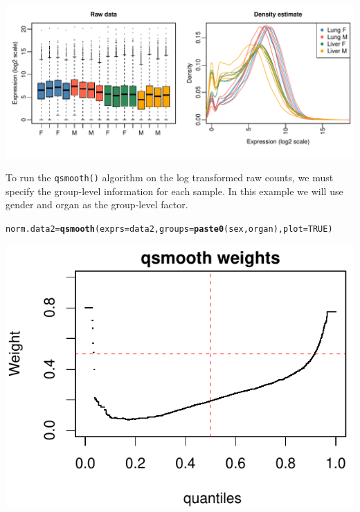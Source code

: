 \documentclass{article}\usepackage[]{graphicx}\usepackage[usenames,dvipsnames]{color}
\makeatletter
\def\maxwidth{ %
  \ifdim\Gin@nat@width>\linewidth
    \linewidth
  \else
    \Gin@nat@width
  \fi
}
\newcommand{\hlnum}[1]{\textcolor[rgb]{0.686,0.059,0.569}{#1}}%
\newcommand{\hlstd}[1]{\textcolor[rgb]{0.345,0.345,0.345}{#1}}%
\newcommand{\hlkwb}[1]{\textcolor[rgb]{0.69,0.353,0.396}{#1}}%
\newcommand{\hlkwc}[1]{\textcolor[rgb]{0.333,0.667,0.333}{#1}}%
\newcommand{\hlkwd}[1]{\textcolor[rgb]{0.737,0.353,0.396}{\textbf{#1}}}%
\newenvironment{kframe}{%
 \def\at@end@of@kframe{}%
 \ifinner\ifhmode%
  \def\at@end@of@kframe{\end{minipage}}%
  \begin{minipage}{\columnwidth}%
 \fi\fi%
 \def\FrameCommand##1{\hskip\@totalleftmargin \hskip-\fboxsep
 \colorbox{shadecolor}{##1}\hskip-\fboxsep
     \hskip-\linewidth \hskip-\@totalleftmargin \hskip\columnwidth}%
 \MakeFramed {\advance\hsize-\width
   \@totalleftmargin\z@ \linewidth\hsize
   \@setminipage}}%
 {\par\unskip\endMakeFramed%
 \at@end@of@kframe}
\newenvironment{knitrout}{}{} %
\makeatother
\begin{document}
\begin{knitrout}
\color{fgcolor}

{\centering \includegraphics[width=\maxwidth]{figure/norm_data2-1} 

}



\end{knitrout}

To run the \texttt{qsmooth()} algorithm on the log transformed raw counts, 
we must specify the group-level information for each sample. In this example 
we will use gender and organ as the group-level factor. 

\begin{knitrout}
\color{fgcolor}\begin{kframe}
\begin{alltt}
\hlstd{norm.data2} \hlkwb{=} \hlkwd{qsmooth}\hlstd{(}\hlkwc{exprs}\hlstd{=data2,} \hlkwc{groups}\hlstd{=}\hlkwd{paste0}\hlstd{(sex, organ),} \hlkwc{plot}\hlstd{=}\hlnum{TRUE}\hlstd{)}
\end{alltt}
\end{kframe}

{\centering \includegraphics[width=\maxwidth]{figure/qsmooth12-1} 

}



\end{knitrout}
\end{document}
